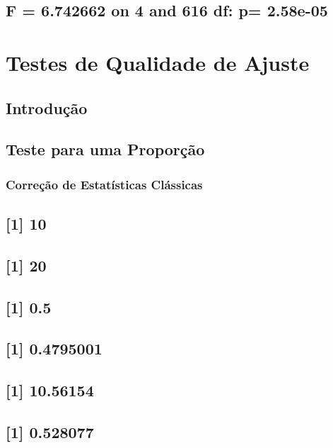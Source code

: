 \documentclass[]{book}
\theoremstyle{definition}
\theoremstyle{definition}
\theoremstyle{definition}
\theoremstyle{remark}
\begin{document}
\section{F = 6.742662 on 4 and 616 df: p=
2.58e-05}\label{f-6.742662-on-4-and-616-df-p-2.58e-05}

\chapter{Testes de Qualidade de Ajuste}\label{testqualajust}

\section{Introdução}\label{introducao-1}

\section{Teste para uma Proporção}\label{teste-para-uma-proporcao}

\subsection{Correção de Estatísticas
Clássicas}\label{correcao-de-estatisticas-classicas}

\section{{[}1{]} 10}\label{section-23}

\section{{[}1{]} 20}\label{section-24}

\section{{[}1{]} 0.5}\label{section-25}

\section{{[}1{]} 0.4795001}\label{section-26}

\section{{[}1{]} 10.56154}\label{section-27}

\section{{[}1{]} 0.528077}\label{section-28}
\end{document}
